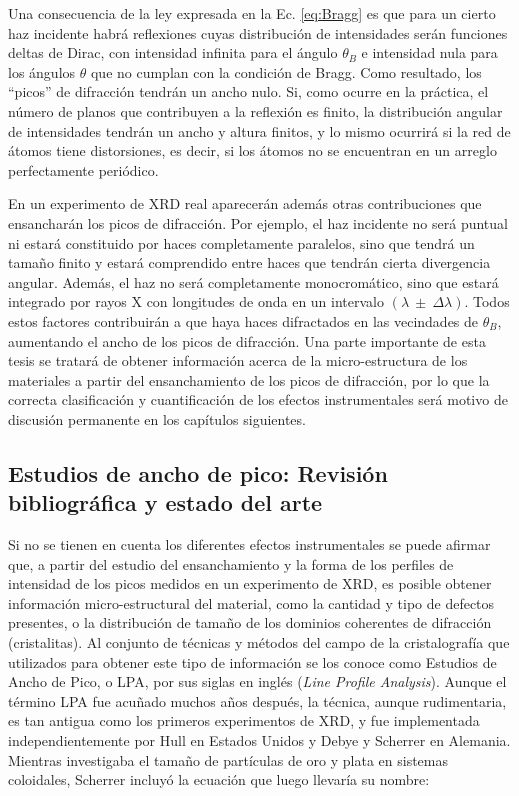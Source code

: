 Una consecuencia de la ley expresada en la Ec. \ref{eq:Bragg} es que para un cierto haz incidente habrá reflexiones cuyas distribución de intensidades serán funciones deltas de Dirac, con intensidad infinita para el ángulo $\theta_{B}$ e intensidad nula para los ángulos $\theta$ que no cumplan con la condición de Bragg. 
Como resultado, los ``picos'' de difracción tendrán un ancho nulo. 
Si, como ocurre en la práctica, el número de planos que contribuyen a la reflexión es finito, la distribución angular de intensidades tendrán un ancho y altura finitos, y lo mismo ocurrirá si la red de átomos tiene distorsiones, es decir, si los átomos no se encuentran en un arreglo perfectamente periódico.

En un experimento de XRD real aparecerán además otras contribuciones que ensancharán los picos de difracción. 
Por ejemplo, el haz incidente no será puntual ni estará constituido por haces completamente paralelos, sino que tendrá un tamaño finito y estará comprendido entre haces que tendrán cierta divergencia angular.
Además, el haz no será completamente monocromático, sino que estará integrado por rayos X con longitudes de onda en un intervalo $(\lambda \ \pm \ \Delta \lambda)$.
Todos estos factores contribuirán a que haya haces difractados en las vecindades de $\theta_{B}$, aumentando el ancho de los picos de difracción. 
Una parte importante de esta tesis se tratará de obtener información acerca de la micro-estructura de los materiales a partir del ensanchamiento de los picos de difracción, por lo que la correcta clasificación y cuantificación de los efectos instrumentales será motivo de discusión permanente en los capítulos siguientes.

\subsection{Estudios de ancho de pico: Revisión bibliográfica y estado del arte}\label{SS:XRD-LPA} 
Si no se tienen en cuenta los diferentes efectos instrumentales se puede afirmar que, a partir del estudio del ensanchamiento y la forma de los perfiles de intensidad de los picos medidos en un experimento de XRD, es posible obtener información micro-estructural del material, como la cantidad y tipo de defectos presentes, o la distribución de tamaño de los dominios coherentes de difracción (cristalitas).
Al conjunto de técnicas y métodos del campo de la cristalografía que utilizados para obtener este tipo de información se los conoce como Estudios de Ancho de Pico, o LPA, por sus siglas en inglés (\textit{Line Profile Analysis}).
Aunque el término LPA fue acuñado muchos años después, la técnica, aunque rudimentaria, es tan antigua como los primeros experimentos de XRD, y fue implementada independientemente por Hull en Estados Unidos y Debye y Scherrer en Alemania. 
Mientras investigaba el tamaño de partículas de oro y plata en sistemas coloidales, Scherrer incluyó la ecuación que luego llevaría su nombre\cite{Scherrer1918}:

